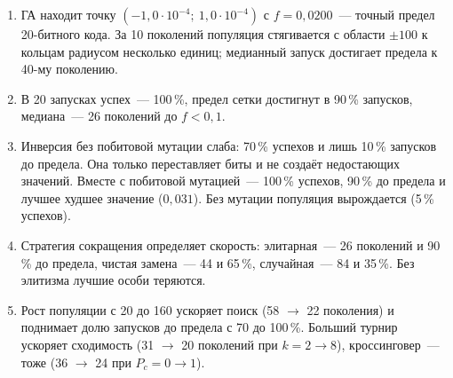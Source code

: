 \documentclass[14pt,a4paper]{extarticle}
\begin{document}
\begin{enumerate}
\item ГА находит точку $(-1{,}0 \cdot 10^{-4};\ 1{,}0 \cdot 10^{-4})$ с $f = 0{,}0200$~--- точный предел 20-битного кода. За 10 поколений популяция стягивается с области $\pm 100$ к кольцам радиусом несколько единиц; медианный запуск достигает предела к 40-му поколению.
\item В 20 запусках успех~--- 100\,\%, предел сетки достигнут в 90\,\% запусков, медиана~--- 26 поколений до $f < 0{,}1$.
\item Инверсия без побитовой мутации слаба: 70\,\% успехов и лишь 10\,\% запусков до предела. Она только переставляет биты и не создаёт недостающих значений. Вместе с побитовой мутацией~--- 100\,\% успехов, 90\,\% до предела и лучшее худшее значение ($0{,}031$). Без мутации популяция вырождается (5\,\% успехов).
\item Стратегия сокращения определяет скорость: элитарная~--- 26 поколений и 90\,\% до предела, чистая замена~--- 44 и 65\,\%, случайная~--- 84 и 35\,\%. Без элитизма лучшие особи теряются.
\item Рост популяции с 20 до 160 ускоряет поиск (58 $\to$ 22 поколения) и поднимает долю запусков до предела с 70 до 100\,\%. Больший турнир ускоряет сходимость (31 $\to$ 20 поколений при $k = 2 \to 8$), кроссинговер~--- тоже (36 $\to$ 24 при $P_c = 0 \to 1$).
\end{enumerate}
\end{document}
